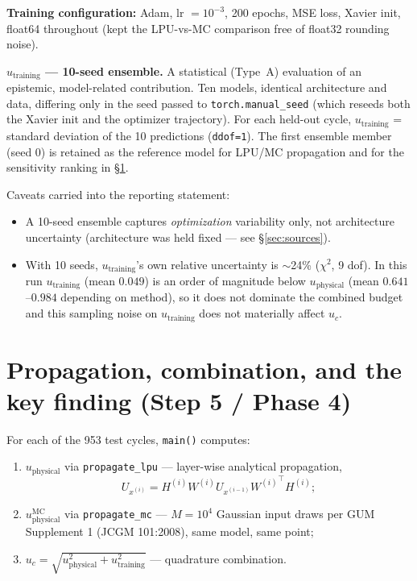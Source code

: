 \documentclass[11pt]{article}
\begin{document}
\textbf{Training configuration:} Adam, lr $=10^{-3}$, 200 epochs, MSE loss,
Xavier init, float64 throughout (kept the LPU-vs-MC comparison free of
float32 rounding noise).

\textbf{$u_{\mathrm{training}}$ --- 10-seed ensemble.} A statistical (Type~A) evaluation of an epistemic, model-related contribution. Ten models, identical architecture
and data, differing only in the seed passed to \texttt{torch.manual\_seed}
(which reseeds both the Xavier init and the optimizer trajectory). For each
held-out cycle, $u_{\mathrm{training}}$ = standard deviation of the 10 predictions
(\texttt{ddof=1}). The first ensemble member (seed 0) is retained as the
reference model for LPU/MC propagation and for the sensitivity ranking in
\S\ref{sec:propagation}.

Caveats carried into the reporting statement:
\begin{itemize}
\item A 10-seed ensemble captures \emph{optimization} variability only, not
architecture uncertainty (architecture was held fixed --- see
\S\ref{sec:sources}).
\item With 10 seeds, $u_{\mathrm{training}}$'s own relative uncertainty is $\sim$24\%
($\chi^2$, 9 dof). In this run $u_{\mathrm{training}}$ (mean $0.049$) is an order of magnitude
below $u_{\mathrm{physical}}$ (mean $0.641$--$0.984$ depending on method), so it does not
dominate the combined budget and this sampling noise on $u_{\mathrm{training}}$ does not
materially affect $u_c$.
\end{itemize}

\section{Propagation, combination, and the key finding (Step 5 / Phase 4)}
\label{sec:propagation}

For each of the 953 test cycles, \texttt{main()} computes:

\begin{enumerate}
\item $u_{\mathrm{physical}}$ via \texttt{propagate\_\allowbreak lpu} --- layer-wise analytical
propagation,
\[
U_{x^{(i)}} = H^{(i)} W^{(i)} U_{x^{(i-1)}} {W^{(i)}}^\top H^{(i)};
\]
\item $u_{\mathrm{physical}}^{\mathrm{MC}}$ via \texttt{propagate\_mc} --- $M=10^4$ Gaussian input
draws per GUM Supplement 1 (JCGM 101:2008), same model, same point;
\item $u_c = \sqrt{u_{\mathrm{physical}}^2 + u_{\mathrm{training}}^2}$ --- quadrature combination.
\end{enumerate}
\end{document}
